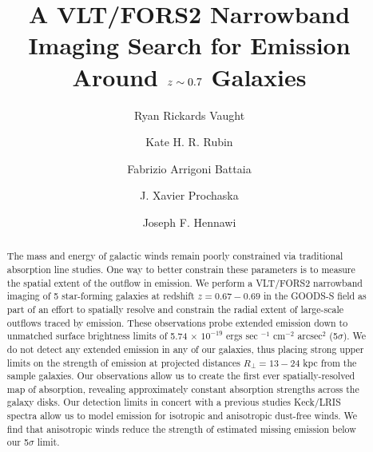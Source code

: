 \documentclass[twocolumn]{aastex61}
\begin{document}
\title{A VLT/FORS2 Narrowband Imaging Search for  Emission Around $\lowercase{z}\sim0.7$ Galaxies }
\author{Ryan Rickards Vaught}
 
 \author{Kate H. R. Rubin }
 
 \author{Fabrizio Arrigoni Battaia }

 \author{J. Xavier Prochaska}
 
\author{Joseph F. Hennawi}


\begin{abstract}

The mass and energy of galactic winds remain poorly constrained via traditional absorption line studies. One way to better constrain these parameters is to measure the spatial extent of the outflow in emission. We perform a VLT/FORS2 narrowband imaging of 5 star-forming galaxies at redshift $z=0.67-0.69$ in the GOODS-S field as part of an effort to spatially resolve and constrain the radial extent of large-scale outflows traced by  emission. These observations probe extended  emission down to unmatched surface brightness limits of 5.74 $\times$ $10^{-19}$ ergs sec $^{-1}$ cm$^{-2}$ arcsec$^2$ (5$\sigma$).  We do not detect any extended  emission in any of our galaxies, thus placing strong upper limits on the strength of  emission at projected distances $R_{\perp} = 13-24$ kpc from the sample galaxies. Our observations allow us to create the first ever spatially-resolved map of  absorption, revealing approximately constant absorption strengths across the galaxy disks. Our detection limits in concert with a previous studies Keck/LRIS spectra allow us to model  emission for isotropic and anisotropic dust-free winds. We find that anisotropic winds reduce the strength of estimated missing  emission below our 5$\sigma$ limit.

\end{abstract}
\end{document}
